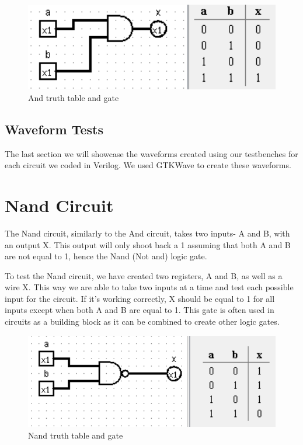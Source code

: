 \documentclass[12pt]{article}
\begin{document}
\begin{figure}[h]
    \centering
    \includegraphics[width = 1.0\textwidth]{figs/andGate.png}
    \caption{And truth table and gate}
    \label{fig:enter-label}
\end{figure}


\subsection{Waveform Tests}

The last section we will showcase the waveforms created using our testbenches for each circuit we coded in Verilog. We used GTKWave to create these waveforms.

\newpage




\section{Nand Circuit}
The Nand circuit, similarly to the And circuit, takes two inputs- A and B, with an output X. This output will only shoot back a 1 assuming that both A and B are not equal to 1, hence the Nand (Not and) logic gate.


To test the Nand circuit, we have created two registers, A and B, as well as a wire X. This way we are able to take two inputs at a time and test each possible input for the circuit. If it's working correctly, X should be equal to 1 for all inputs except when both A and B are equal to 1. This gate is often used in circuits as a building block as it can be combined to create other logic gates.


\begin{figure}[h]
    \centering
    \includegraphics[width = 1.0\textwidth]{figs/Nand CircuitTruth.png}
    \caption{Nand truth table and gate}
    \label{fig:enter-label}
\end{figure}
\end{document}
